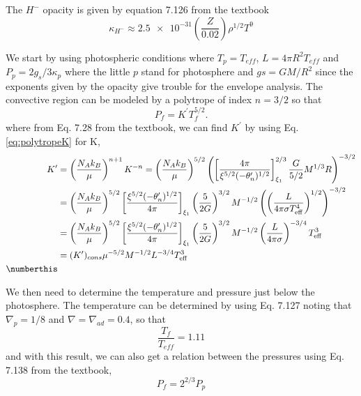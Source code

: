 The $H^{-}$ opacity is given by equation 7.126 from the textbook
\begin{equation}
    \kappa_{H^-}\approx \num{2.5e-31}\left(\frac{Z}{0.02}\right)\rho^{1/2}T^9
    \label{eq:opacity5}
\end{equation}

We start by using photospheric conditions where $T_p = T_{eff}$, $L = 4\pi R^2 T_{eff}$ and $P_p = 2g_s/3\kappa_p$ where the little $p$ stand for photosphere and $gs = GM/R^2$ since the exponents given by the opacity give trouble for the envelope analysis. 
The convective region can be modeled by a polytrope of index $n=3/2$ so that 
\begin{equation}
    P_f = K^\prime T_f^{5/2}.
    \label{eq:polytrope5}
\end{equation}
where from Eq. 7.28 from the textbook, we can find $K^\prime$ by using Eq. \ref{eq:polytropeK} for K,
\begin{align*}
    K^\prime &= \left(\frac{N_A k_B}{\mu}\right)^{n+1}K^{-n} 
    = \left(\frac{N_A k_B}{\mu}\right)^{5/2} \left(\left[\frac{4\pi}{\xi^{5/2}(-\theta^\prime_n)^{1/2}}\right]^{2/3}_{\xi_1}\frac{G}{5/2}M^{1/3}R\right)^{-3/2}\\
    &= \left(\frac{N_A k_B}{\mu}\right)^{5/2} \left[\frac{\xi^{5/2}(-\theta^\prime_n)^{1/2}}{4\pi}\right]_{\xi_1}\left(\frac{5}{2G}\right)^{3/2} M^{-1/2} \left(\left(\frac{L}{4\pi\sigma T_{\mathrm{eff}}^4}\right)^{1/2}\right)^{-3/2}\\
    &= \left(\frac{N_A k_B}{\mu}\right)^{5/2} \left[\frac{\xi^{5/2}(-\theta^\prime_n)^{1/2}}{4\pi}\right]_{\xi_1}\left(\frac{5}{2G}\right)^{3/2} M^{-1/2} \left(\frac{L}{4\pi\sigma}\right)^{-3/4} T_{\mathrm{eff}}^{3}\\
    &= (K^\prime)_{cons} \mu^{-5/2} M^{-1/2} L^{-3/4} T_{\mathrm{eff}}^3\\
    \numberthis\label{eq:kprime5}
\end{align*}

We then need to determine the temperature and pressure just below the photosphere. 
The temperature can be determined by using Eq. 7.127 noting that $\nabla_p = 1/8$ and $\nabla = \nabla_{ad}=0.4$, so that 
\begin{equation}
    \frac{T_f}{T_{eff}} = 1.11 
    \label{eq:tfTeff}
\end{equation}
and with this result, we can also get a relation between the pressures using Eq. 7.138 from the textbook,
\begin{equation}
    P_f = 2^{2/3}P_p
    \label{eq:PfPP}
\end{equation}

